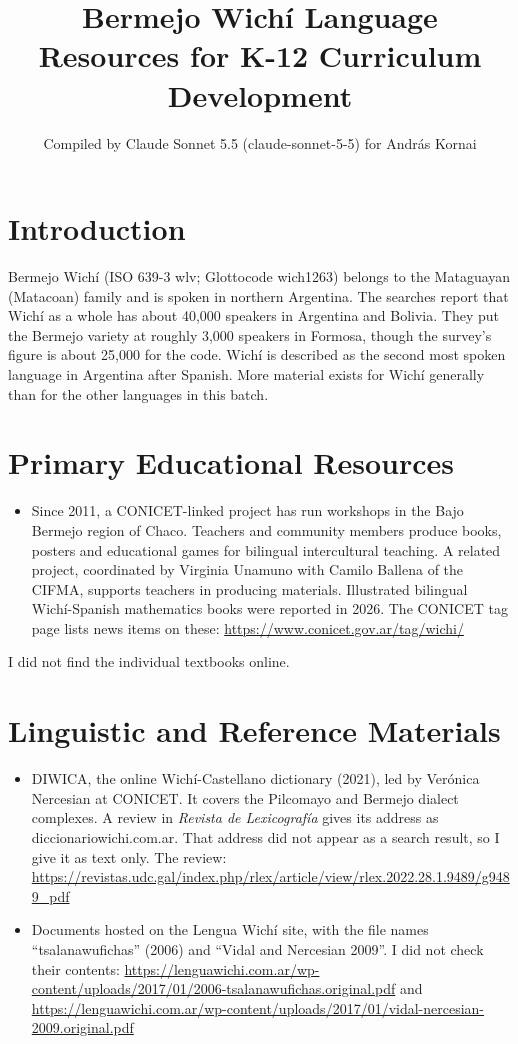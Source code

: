 \documentclass[12pt]{article}
\title{Bermejo Wich\'i Language Resources for K-12 Curriculum Development}
\author{Compiled by Claude Sonnet 5.5 (claude-sonnet-5-5) for Andr\'as Kornai}
\date{}
\begin{document}
\maketitle

\section{Introduction}
Bermejo Wich\'i (ISO 639-3 wlv; Glottocode wich1263) belongs to the Mataguayan (Matacoan) family and is spoken in northern Argentina. The searches report that Wich\'i as a whole has about 40,000 speakers in Argentina and Bolivia. They put the Bermejo variety at roughly 3,000 speakers in Formosa, though the survey's figure is about 25,000 for the code. Wich\'i is described as the second most spoken language in Argentina after Spanish. More material exists for Wich\'i generally than for the other languages in this batch.

\section{Primary Educational Resources}
\begin{itemize}
\item Since 2011, a CONICET-linked project has run workshops in the Bajo Bermejo region of Chaco. Teachers and community members produce books, posters and educational games for bilingual intercultural teaching. A related project, coordinated by Virginia Unamuno with Camilo Ballena of the CIFMA, supports teachers in producing materials. Illustrated bilingual Wich\'i-Spanish mathematics books were reported in 2026. The CONICET tag page lists news items on these: \url{https://www.conicet.gov.ar/tag/wichi/}
\end{itemize}
I did not find the individual textbooks online.

\section{Linguistic and Reference Materials}
\begin{itemize}
\item DIWICA, the online Wich\'i-Castellano dictionary (2021), led by Ver\'onica Nercesian at CONICET. It covers the Pilcomayo and Bermejo dialect complexes. A review in \emph{Revista de Lexicograf\'ia} gives its address as diccionariowichi.com.ar. That address did not appear as a search result, so I give it as text only. The review: \url{https://revistas.udc.gal/index.php/rlex/article/view/rlex.2022.28.1.9489/g9489_pdf}
\item Documents hosted on the Lengua Wich\'i site, with the file names ``tsalanawufichas'' (2006) and ``Vidal and Nercesian 2009''. I did not check their contents: \url{https://lenguawichi.com.ar/wp-content/uploads/2017/01/2006-tsalanawufichas.original.pdf} and \url{https://lenguawichi.com.ar/wp-content/uploads/2017/01/vidal-nercesian-2009.original.pdf}
\end{itemize}
\end{document}

